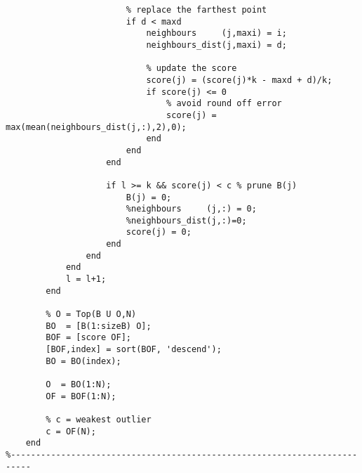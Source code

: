 \begin{lstlisting}
                        % replace the farthest point
                        if d < maxd
                            neighbours     (j,maxi) = i;
                            neighbours_dist(j,maxi) = d;

                            % update the score
                            score(j) = (score(j)*k - maxd + d)/k;
                            if score(j) <= 0
                                % avoid round off error
                                score(j) = max(mean(neighbours_dist(j,:),2),0);
                            end
                        end
                    end

                    if l >= k && score(j) < c % prune B(j)
                        B(j) = 0;
                        %neighbours     (j,:) = 0;
                        %neighbours_dist(j,:)=0;
                        score(j) = 0;
                    end
                end
            end
            l = l+1;
        end

        % O = Top(B U O,N)
        BO  = [B(1:sizeB) O];
        BOF = [score OF];
        [BOF,index] = sort(BOF, 'descend');
        BO = BO(index);

        O  = BO(1:N);
        OF = BOF(1:N);

        % c = weakest outlier
        c = OF(N);
    end
%--------------------------------------------------------------------------
\end{lstlisting}
